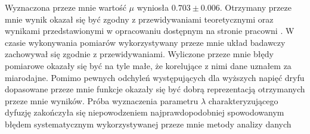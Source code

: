 \documentclass[10pt,a4paper]{article}
\begin{document}
Wyznaczona przeze mnie wartość $\mu$ wyniosła $0.703 \pm 0.006$. Otrzymany przeze mnie wynik okazał się być zgodny z przewidywaniami teoretycznymi oraz wynikami przedstawionymi w opracowaniu dostępnym na stronie pracowni \cite{opracowanie}. W czasie wykonywania pomiarów wykorzystywany przeze mnie układ badawczy zachowywał się zgodnie z przewidywaniami. Wyliczone przeze mnie błędy pomiarowe okazały się być na tyle małe, że korelujące z nimi dane uznałem za miarodajne. Pomimo pewnych odchyleń występujących dla wyższych napięć dryfu dopasowane przeze mnie funkcje okazały się być dobrą reprezentacją otrzymanych przeze mnie wyników. Próba wyznaczenia parametru $\lambda$ charakteryzującego dyfuzję zakończyła się niepowodzeniem najprawdopodobniej spowodowanym błędem systematycznym wykorzystywanej przeze mnie metody analizy danych



\end{document}

